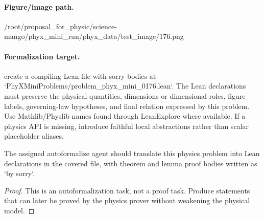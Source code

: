 \paragraph{Figure/image path.}
/root/proposal\_for\_physic/science-mango/phyx\_mini\_run/phyx\_data/test\_image/176.png

\paragraph{Formalization target.}
create a compiling Lean file with sorry bodies at `PhyXMiniProblems/problem\_phyx\_mini\_0176.lean`. The Lean declarations must preserve the physical quantities, dimensions or dimensional roles, figure labels, governing-law hypotheses, and final relation expressed by this problem.
Use Mathlib/Physlib names found through LeanExplore where available. If a physics API is missing, introduce faithful local abstractions rather than scalar placeholder aliases.

\begin{theorem}
\label{thm:physics:phyx_mini_0176:target}
The assigned autoformalize agent should translate this physics problem into Lean declarations in the covered file, with theorem and lemma proof bodies written as `by sorry`.
\end{theorem}
\begin{proof}
This is an autoformalization task, not a proof task. Produce statements that can later be proved by the physics prover without weakening the physical model.
\end{proof}

